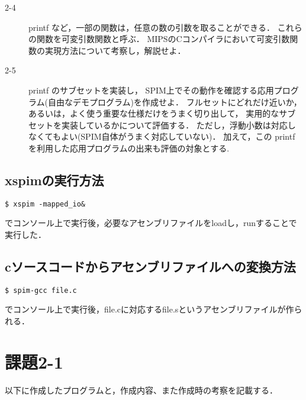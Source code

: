 \documentclass[a4j,11pt]{jarticle}
\begin{document}
\begin{description}
\item[2-4]printf など，一部の関数は，任意の数の引数を取ることができる． これらの関数を可変引数関数と呼ぶ． MIPSのCコンパイラにおいて可変引数関数の実現方法について考察し，解説せよ．

\item[2-5]printf のサブセットを実装し， SPIM上でその動作を確認する応用プログラム(自由なデモプログラム)を作成せよ． フルセットにどれだけ近いか，あるいは，よく使う重要な仕様だけをうまく切り出して， 実用的なサブセットを実装しているかについて評価する． ただし，浮動小数は対応しなくてもよい(SPIM自体がうまく対応していない)． 加えて，この printf を利用した応用プログラムの出来も評価の対象とする.

\end{description}
\subsection{xspimの実行方法}
\begin{verbatim}
$ xspim -mapped_io&
\end{verbatim}
でコンソール上で実行後，必要なアセンブリファイルをloadし，runすることで実行した．

\subsection{cソースコードからアセンブリファイルへの変換方法} 
\begin{verbatim}
$ spim-gcc file.c
\end{verbatim}
でコンソール上で実行後，file.cに対応するfile.sというアセンブリファイルが作られる．
 \section{課題2-1}
以下に作成したプログラムと，作成内容、また作成時の考察を記載する．
\end{document}

